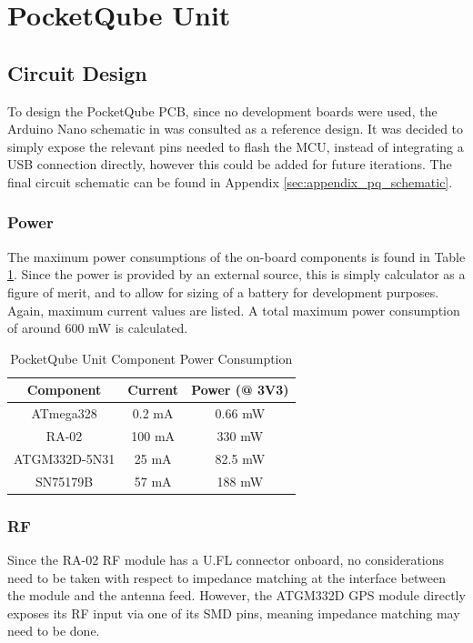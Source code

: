 \graphicspath{{./figures}}

\section{PocketQube Unit}
\subsection{Circuit Design}
To design the PocketQube PCB, since no development boards were used, the Arduino Nano schematic in \cite{design-arduinoNano} was consulted as a reference design. It was decided to simply expose the relevant pins needed to flash the MCU, instead of integrating a USB connection directly, however this could be added for future iterations. The final circuit schematic can be found in Appendix \ref{sec:appendix_pq_schematic}.

\subsubsection{Power}
The maximum power consumptions of the on-board components is found in Table \ref{tab:pqunit_component_consumption}. Since the power is provided by an external source, this is simply calculator as a figure of merit, and to allow for sizing of a battery for development purposes. Again, maximum current values are listed. A total maximum power consumption of around 600 mW is calculated.
\begin{table}[!htb]
  \centering
  \renewcommand{\arraystretch}{1.2}
  \begin{tabular}{ |c|c|c| }
  \hline
  \textbf{Component}        & \textbf{Current}        & \textbf{Power (@ 3V3)}      \\ \hline 
  ATmega328                 & 0.2 mA                  & 0.66 mW                     \\ \hline 
  RA-02                     & 100 mA                  & 330 mW                      \\ \hline 
  ATGM332D-5N31             & 25 mA                   & 82.5 mW                     \\ \hline
  SN75179B                  & 57 mA                   & 188 mW                      \\ \hline
  \end{tabular}
  \caption{PocketQube Unit Component Power Consumption}
  \label{tab:pqunit_component_consumption}
\end{table}

\subsubsection{RF}
Since the RA-02 RF module has a U.FL connector onboard, no considerations need to be taken with respect to impedance matching at the interface between the module and the antenna feed. However, the ATGM332D GPS module directly exposes its RF input via one of its SMD pins, meaning impedance matching may need to be done.

